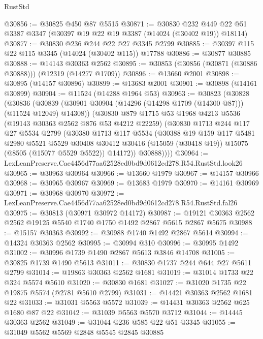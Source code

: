 \begin{lexlean}{RustStd}
\begin{coremodule}
@30856 := @30825 @450 @87 @5515
@30871 := @30830
    @232
    @449
    @22
    @51
    @3387
    @3347
    (@30397 @19 @22 @19 @3387 (@14024 (@30402 @19)) @18114)
@30877 := @30830 @236 @244 @22 @27 @3345 @2799
@30885 := @30397 @115 @22 @115 @3345 (@14024 (@30402 @115)) @17788
@30886 := @30877 @30885
@30888 := @14143 @30363 @2562
@30895 := @30853 (@30856 (@30871 (@30886 @30888))) (@12319 (@14277 @1709))
@30896 := @13660 @2001
@30898 := @30895 (@14157 @30896)
@30899 := @13683 @2001
@30901 := @30898 (@14161 @30899)
@30904 := @11524 (@14288 @1964 @53)
@30963 := @30823
    (@30828
      (@30836
        (@30839 (@30901 @30904 (@14296 (@14298 @1709 (@14300 @87))) (@11524 @12049) @14308))
        (@30830
          @879
          @1715
          @53
          @1968
          @4213
          @5536
          (@19143 @30363 @2562 @876 @53 @4212 @22259)
          (@30830
            @1713
            @244
            @117
            @27
            @5534
            @2799
            (@30380
              @1713
              @117
              @5534
              (@30388
                @19
                @159
                @117
                @5481
                @2980
                @5521
                @5529
                @30408
                @30412
                @30416
                (@15059 (@30418 @19))
                @15075
                (@8505 (@15077 @5529 @5522))
                @14172))
            @30888))))
@30964 := LexLeanPreserve.Cae4456d77aa62528ed0bd9d0612cd278.R54.RustStd.look26
@30965 := @30963 @30964
@30966 := @13660 @1979
@30967 := @14157 @30966
@30968 := @30965 @30967
@30969 := @13683 @1979
@30970 := @14161 @30969
@30971 := @30968 @30970
@30972 := LexLeanPreserve.Cae4456d77aa62528ed0bd9d0612cd278.R54.RustStd.fal26
@30975 := @30813 (@30971 @30972 @14172)
@30987 := @19121 @30363 @2562 @2562 @19125 @5540 @1740 @1750 @1492 @2867 @5615 @2867 @5675
@30988 := @15157 @30363
@30992 := @30988 @1740 @1492 @2867 @5614
@30994 := @14324 @30363 @2562
@30995 := @30994 @310
@30996 := @30995 @1492
@31002 := @30996 @1739 @1490 @2867 @5613 @3846 @14708
@31005 := @30825 @1739 @1490 @5613
@31011 := @30830 @1737 @244 @644 @27 @5611 @2799
@31014 := @19863 @30363 @2562 @1681
@31019 := @31014 @1733 @22 @324 @5574 @5610
@31020 := @30830 @1681
@31027 := @31020 @1735 @22 @19875 @5574 (@2781 @5610 @2799)
@31031 := @14421 @30363 @2562 @1681 @22
@31033 := @31031 @5563 @5572
@31039 := @14431 @30363 @2562 @625 @1680 @87 @22
@31042 := @31039 @5563 @5570 @3712
@31044 := @14445 @30363 @2562
@31049 := @31044 @236 @585 @22 @51 @3345
@31055 := @31049 @5562 @5569 @2848 @5545 @2845 @30885

\end{coremodule}
\end{lexlean}

